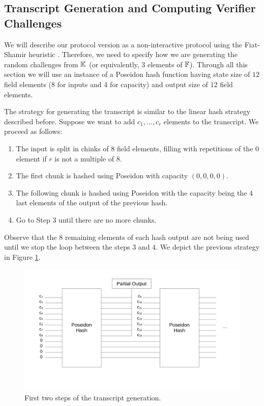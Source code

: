 

\subsection{Transcript Generation and Computing Verifier Challenges}\label{sec:transcript-gen}

We will describe our protocol version as a non-interactive protocol using the Fiat-Shamir heuristic \cite{C:FiaSha86}. Therefore, we need to specify how we are generating the random challenges from $\mathbb{K}$ (or equivalently, $3$ elements of $\mathbb{F}$). Through all this section we will use an instance of a Poseidon hash function having state size of $12$ field elements ($8$ for inputs and $4$ for capacity) and output size of $12$ field elements. 

The strategy for generating the transcript is similar to the linear hash strategy described before. Suppose we want to add $c_1, \dots, c_r$ elements to the transcript. We proceed as follows:

\begin{enumerate}

\item The input is split in chinks of $8$ field elements, filling with repetitions of the $0$ element if $r$ is not a multiple of $8$. 

\item The first chunk is hashed using Poseidon with capacity $(0,0,0,0)$.

\item The following chunk is hashed using Poseidon with the capacity being the $4$ last elements of the output of the previous hash. 

\item Go to Step $3$ until there are no more chunks. 

\end{enumerate}

Observe that the $8$ remaining elements of each hash output are not being used until we stop the loop between the steps $3$ and $4$. We depict the previous strategy in Figure \ref{fig:transcript-gen}.  

\begin{figure}[h!]
\centering
\includegraphics[width=.8\textwidth]{../figures/transcript}
\caption{First two steps of the transcript generation.}
\label{fig:transcript-gen}
\end{figure}

